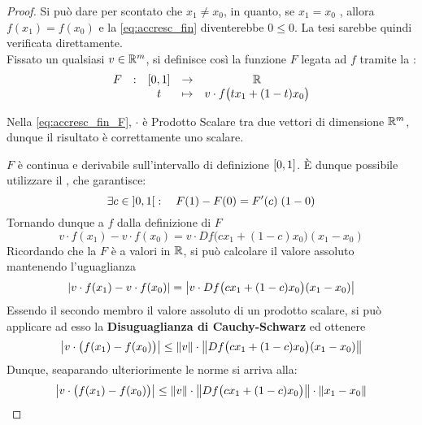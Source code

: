 \begin{theorem}
	\begin{proof}
		Si può dare per scontato che $x_1 \neq x_0$, in quanto, se $x_1 = x_0$ , allora $f(x_1) = f(x_0)$ e la \cref{eq:accresc_fin} diventerebbe $0 \leq 0$. La tesi sarebbe quindi verificata direttamente.\\
		Fissato un qualsiasi $v \in \mathbb{R}^m$, si definisce così la funzione $F$ legata ad $f$ tramite la :
		\begin{equation}
			\label{eq:accresc_fin_F}
			\begin{array}{ccccc} {F} & : & {\left[0,1\right]} & \to & {\mathbb{R}} \\ & & {t} & \mapsto & {v \cdot f \bigl( t x_1 + (1-t)x_0 \bigr)} \\ \end{array}
		\end{equation}
		\begin{note}
			Nella \cref{eq:accresc_fin_F},  $\cdot$  è Prodotto Scalare tra due vettori di dimensione $\mathbb{R}^m$, dunque il risultato è correttamente uno scalare.
		\end{note}
		$F$ è continua e derivabile sull'intervallo di definizione $\left[0,1\right]$. È dunque possibile utilizzare il , che garantisce:
		\[\exists c \in \left]0,1\right[: \quad F(1) - F(0) = F'(c) \; (1-0)\]
		Tornando dunque a $f$ dalla definizione di $F$
		\[v \cdot f(x_1) - v \cdot f(x_0) = v \cdot Df\bigl( cx_1 + (1-c)x_0 \bigr) (x_1 - x_0)\]
		Ricordando che la $F$ è a valori in $\mathbb{R}$, si può calcolare il valore assoluto mantenendo l'uguaglianza
		\[\left|v \cdot f(x_1) - v \cdot f(x_0)\right| = \left|v \cdot Df\bigl( cx_1 + (1-c)x_0 \bigr) (x_1 - x_0)\right|\]
		Essendo il secondo membro il valore assoluto di un prodotto scalare, si può applicare ad esso la \textbf{Disuguaglianza di Cauchy-Schwarz} ed ottenere
		\[\left|v \cdot \bigl( f(x_1) - f(x_0) \bigr)\right| \leq \left\|v\right\| \cdot \left\|Df\bigl( cx_1 + (1-c)x_0 \bigr) (x_1 - x_0)\right\|\]
		Dunque, seaparando ulteriorimente le norme si arriva alla:
		\begin{equation}
			\label{eq:accr_fin_norm}
			\left|v \cdot \bigl( f(x_1) - f(x_0) \bigr)\right| \leq \left\|v\right\| \cdot \left\|Df\bigl( cx_1 + (1-c)x_0 \bigr)\right\| \cdot \left\|x_1 - x_0\right\|
		\end{equation}


\end{proof}
\end{theorem}
